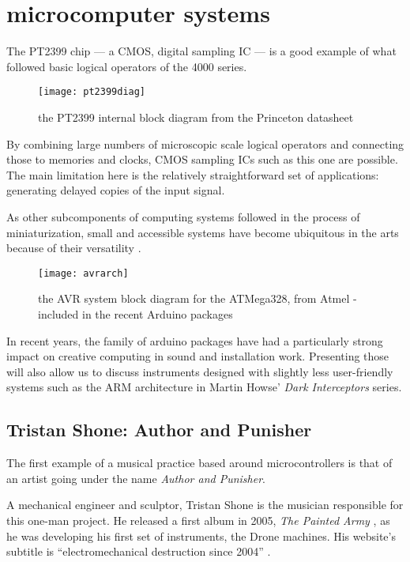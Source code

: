\section{microcomputer systems}

The PT2399 chip — a CMOS, digital sampling IC — is a good example of what followed basic logical operators of the 4000 series. 

	\begin{figure}[h!]
	  \caption{the PT2399 internal block diagram from the Princeton datasheet}
	  \centering
	    \texttt{[image: pt2399diag]}
	\end{figure}

By combining large numbers of microscopic scale logical operators and connecting those to memories and clocks, CMOS sampling ICs such as this one are possible. The main limitation here is the relatively straightforward set of applications: generating delayed copies of the input signal. 

As other subcomponents of computing systems followed in the process of miniaturization, small and accessible systems have become ubiquitous in the arts because of their versatility \citep{gibb2010}.

	\begin{figure}[h!]
	  \caption{the AVR system block diagram for the ATMega328, from Atmel - included in the recent Arduino packages}
	  \centering
	    \texttt{[image: avrarch]}
	\end{figure}

In recent years, the family of arduino packages have had a particularly strong impact on creative computing in sound and installation work. Presenting those will also allow us to discuss instruments designed with slightly less user-friendly systems such as the ARM architecture in Martin Howse' \emph{Dark Interceptors} series.  

 

\subsection{Tristan Shone: Author and Punisher}

The first example of a musical practice based around microcontrollers is that of an artist going under the name \emph{Author and Punisher}. 

A mechanical engineer and sculptor, Tristan Shone is the musician responsible for this one-man project. He released a first album in 2005, \emph{The Painted Army} \citep{shone,2005}, as he was developing his first set of instruments, the Drone machines. His website's subtitle is ``electromechanical destruction since 2004'' \citep{shone2004}.

